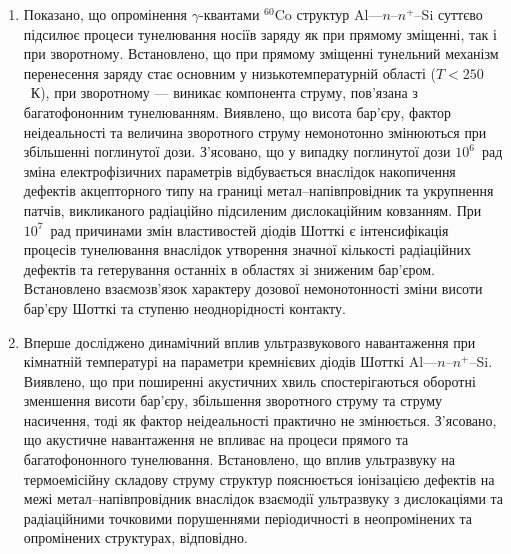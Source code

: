 \begin{enumerate}[leftmargin=0cm,itemindent=3em]
\item
     Показано, що опромінення $\gamma$-квантами $^{60}$Co структур Al---$n$--$n^+$--Si суттєво підсилює процеси тунелювання носіїв заряду як при прямому зміщенні, так і при зворотному.
     Встановлено, що при прямому зміщенні тунельний механізм перенесення заряду стає основним у низькотемпературній області ($T<250$~К),
 при зворотному --- виникає компонента струму, пов'язана з багатофононним тунелюванням.
 Виявлено, що висота бар'єру, фактор неідеальності та величина зворотного струму немонотонно змінюються при збільшенні поглинутої дози.
З'ясовано, що у випадку поглинутої дози $10^6$~рад зміна
електрофізичних
параметрів відбувається внаслідок накопичення дефектів акцепторного типу на границі метал--напівпровідник та укрупнення патчів, викликаного радіаційно підсиленим дислокаційним ковзанням.
При $10^7$~рад
  причинами змін властивостей діодів Шотткі є інтенсифікація процесів тунелювання внаслідок утворення значної кількості радіаційних дефектів та гетерування останніх в областях зі зниженим бар'єром.
Встановлено взаємозв'язок характеру дозової немонотонності зміни висоти бар'єру Шотткі та ступеню неоднорідності контакту.


\item
Вперше досліджено динамічний вплив ультразвукового навантаження при кімнатній температурі на параметри кремнієвих діодів Шотткі Al---$n$--$n^+$--Si.
Виявлено, що при поширенні акустичних хвиль спостерігаються оборотні зменшення висоти бар'єру,
збільшення зворотного струму та струму насичення, тоді як фактор неідеальності практично не змінюється.
З'ясовано, що акустичне навантаження не впливає на процеси прямого та багатофононного тунелювання.
Встановлено, що вплив ультразвуку на термоемісійну складову струму структур пояснюється іонізацією дефектів на межі метал--напівпровідник
  внаслідок взаємодії ультразвуку з дислокаціями та радіаційними точковими порушеннями періодичності в неопромінених та опромінених структурах, відповідно.


\end{enumerate}
